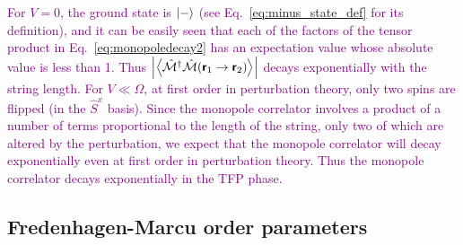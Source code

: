 \documentclass[twocolumn,superscriptaddress,amsmath,amssymb,aps,prx,nofootinbib]{revtex4-2}
\newcommand{\dual}[1]{\boldsymbol{\mathsf{#1}}}
\newcommand{\newtext}[1]{\textcolor{purple}{#1}}
\begin{document}
\newtext{For $V=0$, the ground state is $\ket{-}$ (see Eq.~\eqref{eq:minus_state_def} for its definition), and it can be easily seen that each of the factors of the tensor product in Eq.~\eqref{eq:monopoledecay2} has an expectation value whose absolute value is less than 1.
Thus $\abs{\expval{\hat{\mathcal{M}}^\dagger \hat{\mathcal{M}} (\dual{r}_1\rightarrow \dual{r}_2)}}$ decays exponentially with the string length. For $V \ll \Omega$, at first order in perturbation theory, only two spins are flipped (in the $\hat{S}^x$ basis). Since the monopole correlator involves a product of a number of terms proportional to the length of the string, only two of which are altered by the perturbation, we expect that the monopole correlator will decay exponentially even at first order in perturbation theory. 
Thus the monopole correlator decays exponentially in the TFP phase. }\\

\subsection{Fredenhagen-Marcu order parameters} \label{sec:fm_order_param}
\end{document}
